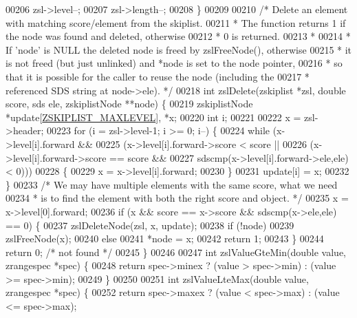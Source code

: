 \begin{DoxyCode}
00206         zsl->level--;
00207     zsl->length--;
00208 \}
00209 
00210 \textcolor{comment}{/* Delete an element with matching score/element from the skiplist.}
00211 \textcolor{comment}{ * The function returns 1 if the node was found and deleted, otherwise}
00212 \textcolor{comment}{ * 0 is returned.}
00213 \textcolor{comment}{ *}
00214 \textcolor{comment}{ * If 'node' is NULL the deleted node is freed by zslFreeNode(), otherwise}
00215 \textcolor{comment}{ * it is not freed (but just unlinked) and *node is set to the node pointer,}
00216 \textcolor{comment}{ * so that it is possible for the caller to reuse the node (including the}
00217 \textcolor{comment}{ * referenced SDS string at node->ele). */}
00218 \textcolor{keywordtype}{int} zslDelete(zskiplist *zsl, \textcolor{keywordtype}{double} score, sds ele, zskiplistNode **node) \{
00219     zskiplistNode *update[\hyperlink{server_8h_a36822e3ce2740c64859068fd849e227b}{ZSKIPLIST\_MAXLEVEL}], *x;
00220     \textcolor{keywordtype}{int} i;
00221 
00222     x = zsl->header;
00223     \textcolor{keywordflow}{for} (i = zsl->level-1; i >= 0; i--) \{
00224         \textcolor{keywordflow}{while} (x->level[i].forward &&
00225                 (x->level[i].forward->score < score ||
00226                     (x->level[i].forward->score == score &&
00227                      sdscmp(x->level[i].forward->ele,ele) < 0)))
00228         \{
00229             x = x->level[i].forward;
00230         \}
00231         update[i] = x;
00232     \}
00233     \textcolor{comment}{/* We may have multiple elements with the same score, what we need}
00234 \textcolor{comment}{     * is to find the element with both the right score and object. */}
00235     x = x->level[0].forward;
00236     \textcolor{keywordflow}{if} (x && score == x->score && sdscmp(x->ele,ele) == 0) \{
00237         zslDeleteNode(zsl, x, update);
00238         \textcolor{keywordflow}{if} (!node)
00239             zslFreeNode(x);
00240         \textcolor{keywordflow}{else}
00241             *node = x;
00242         \textcolor{keywordflow}{return} 1;
00243     \}
00244     \textcolor{keywordflow}{return} 0; \textcolor{comment}{/* not found */}
00245 \}
00246 
00247 \textcolor{keywordtype}{int} zslValueGteMin(\textcolor{keywordtype}{double} value, zrangespec *spec) \{
00248     \textcolor{keywordflow}{return} spec->minex ? (value > spec->min) : (value >= spec->min);
00249 \}
00250 
00251 \textcolor{keywordtype}{int} zslValueLteMax(\textcolor{keywordtype}{double} value, zrangespec *spec) \{
00252     \textcolor{keywordflow}{return} spec->maxex ? (value < spec->max) : (value <= spec->max);

\end{DoxyCode}
